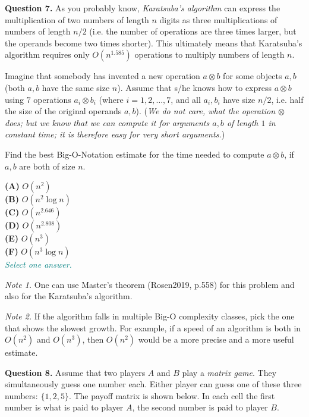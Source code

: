 \documentclass[jou]{apa6}
\begin{document}
\vspace{10pt}
{\bf Question 7.} As you probably know, {\em Karatsuba's algorithm} can express 
the multiplication of two numbers of length $n$ digits as 
three multiplications of numbers of length $n/2$ (i.e. the number of 
operations are three times larger, but the operands become two times shorter). 
This ultimately means that Karatsuba's algorithm requires
only $O(n^{1.585})$ operations to multiply numbers of length $n$.

Imagine that somebody has invented a new operation $a \otimes b$ for 
some objects $a,b$ (both $a,b$ have the same size $n$). 
Assume that s/he knows how to express 
$a \otimes b$ using $7$ operations $a_i \otimes b_i$ (where $i = 1,2,\ldots,7$, and
all $a_i,b_i$ have size $n/2$, i.e. half the size of the original operands $a,b$). 
({\em We do not care, what the operation $\otimes$ does; but we know that we 
can compute it for arguments $a,b$ of length $1$ in constant time; it is 
therefore easy for very short arguments.})

Find the best Big-O-Notation estimate for the time needed to compute $a \otimes b$, if $a,b$ are
both of size $n$. 

{\bf (A)} $O(n^2)$\\
{\bf (B)} $O(n^2 \log n)$\\
{\bf (C)} $O(n^{2.646})$\\
{\bf (D)} $O(n^{2.808})$\\
{\bf (E)} $O(n^3)$\\
{\bf (F)} $O(n^3 \log n)$\\
\textcolor{teal}{\em Select one answer.}

\vspace{4pt}
{\em Note 1.} One can use Master's theorem (Rosen2019, p.558) for 
this problem and also for the Karatsuba's algorithm.

\vspace{4pt}
{\em Note 2.} If the algorithm falls in multiple Big-O complexity classes, pick 
the one that shows the slowest growth. For example, if a speed of an algorithm is 
both in $O(n^2)$ and $O(n^3)$, 
then $O(n^2)$ would be a more precise and a more useful estimate.


\vspace{10pt}
{\bf Question 8.} Assume that two players $A$ and $B$ play a {\em matrix game}. 
They simultaneously guess one number each. Either player can guess 
one of these three numbers: $\{ 1,2,5 \}$. 
The payoff matrix is shown below. 
In each cell the first number is what is paid to player $A$, 
the second number is paid to player $B$. 
\end{document}
